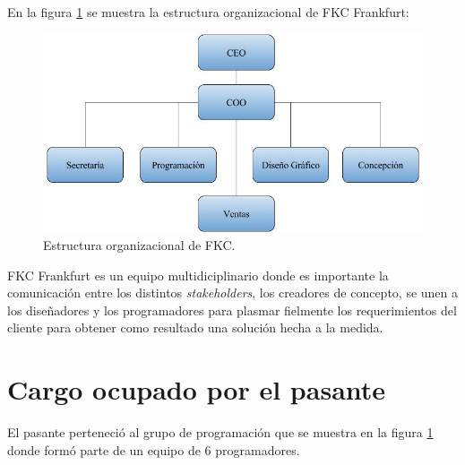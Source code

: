 En la figura \ref{fig:estructuraFKC} se muestra la estructura organizacional de FKC Frankfurt:

\begin{figure}[h]
\begin{center}
	\includegraphics[width=\textwidth]{figuras/estructuraFKC.jpg}
	\caption{Estructura organizacional de FKC.} \label{fig:estructuraFKC}
\end{center}
\end{figure}

FKC Frankfurt es un equipo multidiciplinario donde es importante la comunicación entre los distintos \emph{stakeholders}, los creadores de concepto, se unen a los diseñadores y los programadores para plasmar fielmente los requerimientos del cliente para obtener como resultado una solución hecha a la medida.

\section{Cargo ocupado por el pasante} 

El pasante perteneció al grupo de programación que se muestra en la figura \ref{fig:estructuraFKC} donde formó parte de un equipo de 6 programadores.



